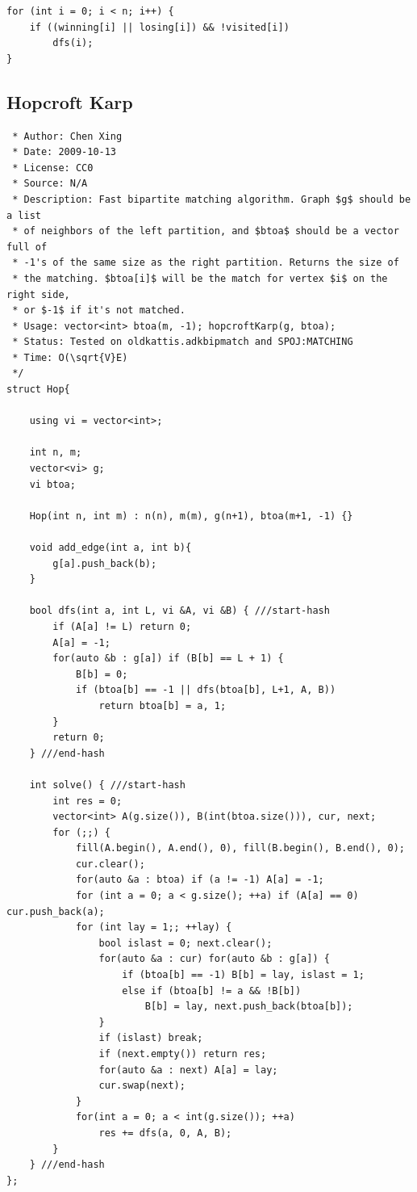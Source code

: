 \documentclass[9pt, a4paper, notitlepage]{extreport}
\begin{document}
\begin{multicols}{3}
\begin{verbatim}
for (int i = 0; i < n; i++) {
    if ((winning[i] || losing[i]) && !visited[i])
        dfs(i);
}
\end{verbatim}

\subsection{Hopcroft Karp}
\begin{verbatim}
 * Author: Chen Xing
 * Date: 2009-10-13
 * License: CC0
 * Source: N/A
 * Description: Fast bipartite matching algorithm. Graph $g$ should be a list
 * of neighbors of the left partition, and $btoa$ should be a vector full of
 * -1's of the same size as the right partition. Returns the size of
 * the matching. $btoa[i]$ will be the match for vertex $i$ on the right side,
 * or $-1$ if it's not matched.
 * Usage: vector<int> btoa(m, -1); hopcroftKarp(g, btoa);
 * Status: Tested on oldkattis.adkbipmatch and SPOJ:MATCHING
 * Time: O(\sqrt{V}E)
 */
struct Hop{

    using vi = vector<int>;

    int n, m;
    vector<vi> g;
    vi btoa;

    Hop(int n, int m) : n(n), m(m), g(n+1), btoa(m+1, -1) {}

    void add_edge(int a, int b){
        g[a].push_back(b);
    }

    bool dfs(int a, int L, vi &A, vi &B) { ///start-hash
        if (A[a] != L) return 0;
        A[a] = -1;
        for(auto &b : g[a]) if (B[b] == L + 1) {
            B[b] = 0;
            if (btoa[b] == -1 || dfs(btoa[b], L+1, A, B))
                return btoa[b] = a, 1;
        }
        return 0;
    } ///end-hash

    int solve() { ///start-hash
        int res = 0;
        vector<int> A(g.size()), B(int(btoa.size())), cur, next;
        for (;;) {
            fill(A.begin(), A.end(), 0), fill(B.begin(), B.end(), 0);
            cur.clear();
            for(auto &a : btoa) if (a != -1) A[a] = -1;
            for (int a = 0; a < g.size(); ++a) if (A[a] == 0) cur.push_back(a);
            for (int lay = 1;; ++lay) { 
                bool islast = 0; next.clear();
                for(auto &a : cur) for(auto &b : g[a]) {
                    if (btoa[b] == -1) B[b] = lay, islast = 1;
                    else if (btoa[b] != a && !B[b])
                        B[b] = lay, next.push_back(btoa[b]);
                }
                if (islast) break;
                if (next.empty()) return res;
                for(auto &a : next) A[a] = lay;
                cur.swap(next);
            }
            for(int a = 0; a < int(g.size()); ++a)
                res += dfs(a, 0, A, B);
        }
    } ///end-hash
};
\end{verbatim}


\end{multicols}
\end{document}
